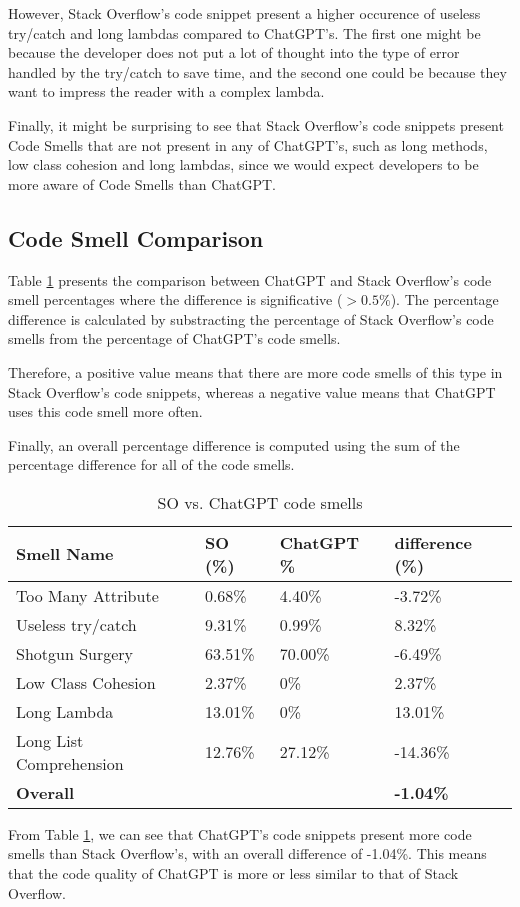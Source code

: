 However, Stack Overflow's code snippet present a higher occurence of useless try/catch and long lambdas compared to ChatGPT's. The first one might be because the developer does not put a lot of thought into the type of error handled by the try/catch to save time, and the second one could be because they want to impress the reader with a complex lambda.

Finally, it might be surprising to see that Stack Overflow's code snippets present Code Smells that are not present in any of ChatGPT's, such as long methods, low class cohesion and long lambdas, since we would expect developers to be more aware of Code Smells than ChatGPT.

\subsection{Code Smell Comparison}
\label{sec:results-comparison}

Table \ref{table:result-comparison} presents the comparison between ChatGPT and Stack Overflow's code smell percentages where the difference is significative ($>0.5\%$). The percentage difference is calculated by substracting the percentage of Stack Overflow's code smells from the percentage of ChatGPT's code smells.

Therefore, a positive value means that there are more code smells of this type in Stack Overflow's code snippets, whereas a negative value means that ChatGPT uses this code smell more often.

Finally, an overall percentage difference is computed using the sum of the percentage difference for all of the code smells.

\begin{table}[!ht]
    \centering
    \caption{SO vs. ChatGPT code smells}
    \begin{tabular}{llll}
        \hline
        \textbf{Smell Name}     & \textbf{SO (\%)} & \textbf{ChatGPT \%} & \textbf{difference (\%)} \\ \hline
        Too Many Attribute      & 0.68\%           & 4.40\%              & -3.72\%                  \\
        Useless try/catch       & 9.31\%           & 0.99\%              & 8.32\%                   \\
        Shotgun Surgery         & 63.51\%          & 70.00\%             & -6.49\%                  \\
        Low Class Cohesion      & 2.37\%           & 0\%                 & 2.37\%                   \\
        Long Lambda             & 13.01\%          & 0\%                 & 13.01\%                  \\
        Long List Comprehension & 12.76\%          & 27.12\%             & -14.36\%                 \\
        \textbf{Overall}        &                  & ~                   & \textbf{-1.04\%}         \\ \hline
    \end{tabular}
    \label{table:result-comparison}
\end{table}

From Table \ref{table:result-comparison}, we can see that ChatGPT's code snippets present more code smells than Stack Overflow's, with an overall difference of -1.04\%. This means that the code quality of ChatGPT is more or less similar to that of Stack Overflow.
